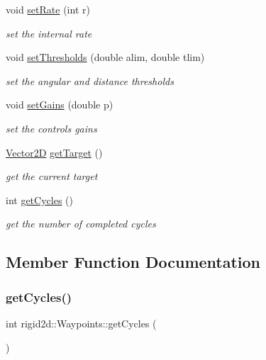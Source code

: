 \begin{DoxyCompactItemize}
void \hyperlink{classrigid2d_1_1Waypoints_a00beb3a1c2d2f3b24e2a107221a8fa9c}{set\+Rate} (int r)
\begin{DoxyCompactList}\small\item\em set the internal rate \end{DoxyCompactList}\item 
void \hyperlink{classrigid2d_1_1Waypoints_a056d60e2226093ab70f218f6088e0bd9}{set\+Thresholds} (double alim, double tlim)
\begin{DoxyCompactList}\small\item\em set the angular and distance thresholds \end{DoxyCompactList}\item 
void \hyperlink{classrigid2d_1_1Waypoints_a2b29f071318d349824d8b704d01e32bf}{set\+Gains} (double p)
\begin{DoxyCompactList}\small\item\em set the controls gains \end{DoxyCompactList}\item 
\hyperlink{structrigid2d_1_1Vector2D}{Vector2D} \hyperlink{classrigid2d_1_1Waypoints_a2d50627bc6c0b74b247bebe0bdbcec38}{get\+Target} ()
\begin{DoxyCompactList}\small\item\em get the current target \end{DoxyCompactList}\item 
int \hyperlink{classrigid2d_1_1Waypoints_a75955fd8b5eb08a4da95668e4fb6aee6}{get\+Cycles} ()
\begin{DoxyCompactList}\small\item\em get the number of completed cycles \end{DoxyCompactList}\end{DoxyCompactItemize}


\subsection{Member Function Documentation}
\mbox{\label{classrigid2d_1_1Waypoints_a75955fd8b5eb08a4da95668e4fb6aee6}} 
\subsubsection{\texorpdfstring{get\+Cycles()}{getCycles()}}
{\footnotesize\ttfamily int rigid2d\+::\+Waypoints\+::get\+Cycles (\begin{DoxyParamCaption}{ }\end{DoxyParamCaption})}



